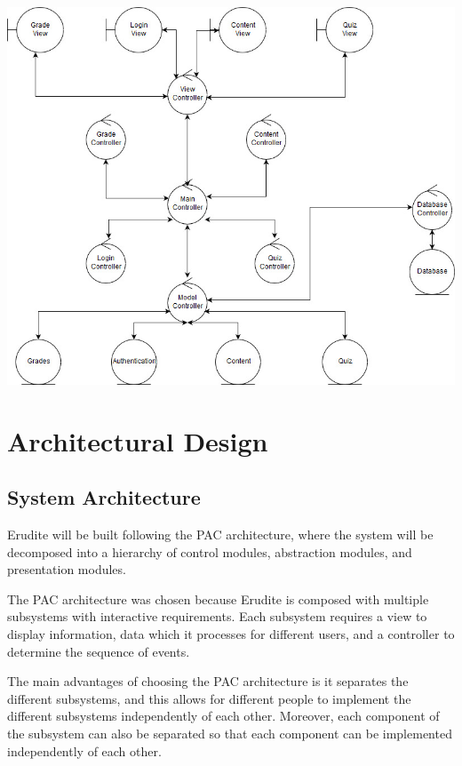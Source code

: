 \documentclass[]{article}
\begin{document}
{
  \centering
  \includegraphics[scale=0.5]{A2_Assets/Analysis_Class_Diagrm_v2.jpg}
}


\section{Architectural Design}
\label{sec:architectural_design}




\subsection{System Architecture}
\label{sub:system_architecture}
Erudite will be built following the PAC architecture, where the system will be decomposed into a hierarchy of control modules, abstraction modules, and presentation modules.

The PAC architecture was chosen because Erudite is composed with multiple subsystems with interactive requirements. Each subsystem requires a view to display information, data which it processes for different users, and a controller to determine the sequence of events. 

The main advantages of choosing the PAC architecture is it separates the different subsystems, and this allows for different people to implement the different subsystems independently of each other. Moreover, each component of the subsystem can also be separated so that each component can be implemented independently of each other.
\end{document}
